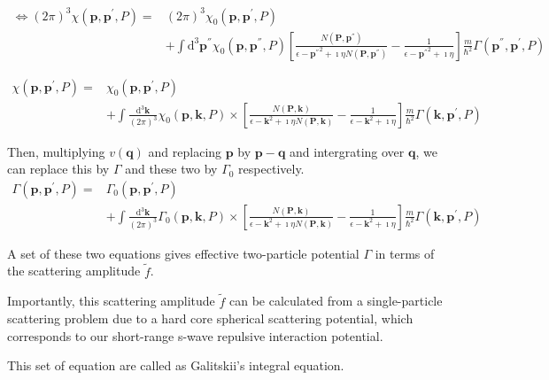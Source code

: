 \[ \begin{split} \Leftrightarrow (2\pi)^3 \chi(\mathbf{p},\mathbf{p}^{'},P) =& (2\pi)^3\chi_0(\mathbf{p},\mathbf{p}^{'},P) \\
&+ \int \mathrm{d}^3 \mathbf{p}^{''} \chi_0(\mathbf{p},\mathbf{p}^{''},P) \left[ \frac{N(\mathbf{P},\mathbf{p}^{''})}{\epsilon - {\mathbf{p}^{''}}^2+\imath \eta N(\mathbf{P},\mathbf{p}^{''})} - \frac{1}{\epsilon - {\mathbf{p}^{''}}^2+\imath \eta} \right]\frac{m}{\hbar^2} \Gamma(\mathbf{p}^{''},\mathbf{p}^{'},P) \end{split}\]

\[ \begin{split} \chi(\mathbf{p},\mathbf{p}^{'},P) =& \chi_0(\mathbf{p},\mathbf{p}^{'},P) \\
&+ \int \frac{\mathrm{d}^3 \mathbf{k}}{(2\pi)^3} \chi_0(\mathbf{p},\mathbf{k},P) \times \left[ \frac{N(\mathbf{P},\mathbf{k})}{\epsilon - {\mathbf{k}}^2+\imath \eta N(\mathbf{P},\mathbf{k})} - \frac{1}{\epsilon - {\mathbf{k}}^2+\imath \eta} \right]\frac{m}{\hbar^2} \Gamma(\mathbf{k},\mathbf{p}^{'},P)\end{split}\]

Then, multiplying $v(\mathbf{q})$ and replacing $\mathbf{p}$ by $\mathbf{p}-\mathbf{q}$ and intergrating over $\mathbf{q}$, we can replace this by $\Gamma$ and these two by $\Gamma_0$ respectively.
\begin{equation} \label{Eqs2.7.24} \begin{split}
\Gamma(\mathbf{p},\mathbf{p}^{'},P) =& \Gamma_0(\mathbf{p},\mathbf{p}^{'},P) \\
&+ \int \frac{\mathrm{d}^3 \mathbf{k}}{(2\pi)^3} \Gamma_0(\mathbf{p},\mathbf{k},P) \times \left[ \frac{N(\mathbf{P},\mathbf{k})}{\epsilon - {\mathbf{k}}^2+\imath \eta N(\mathbf{P},\mathbf{k})} - \frac{1}{\epsilon - {\mathbf{k}}^2+\imath \eta} \right]\frac{m}{\hbar^2} \Gamma(\mathbf{k},\mathbf{p}^{'},P)
\end{split}\end{equation}

A set of these two equations gives effective two-particle potential $\Gamma$ in terms of the scattering amplitude $\tilde{f}$.

Importantly, this scattering amplitude $\tilde{f}$ can be calculated from a single-particle scattering problem due to a hard core spherical scattering potential, which corresponds to our short-range s-wave repulsive interaction potential.

This set of equation are called as Galitskii's integral equation.

